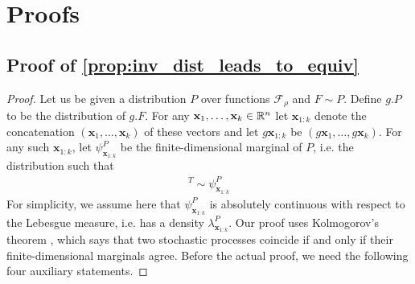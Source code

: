 \section{Proofs} \subsection{Proof of \cref{prop:inv_dist_leads_to_equiv} } \label{proof:invprior} \begin{proof} Let us be given a distribution $P$ over functions $\mathcal{F}_\rho$ and $F\sim P$.
	Define $g.P$ to be the distribution of $g.F$.
	For any $\mathbf{x}_1,\dots,\mathbf{x}_k\in\mathbb{R}^n$ let $\mathbf{x}_{1:k}$ denote the concatenation $(\mathbf{x}_1,\dots,\mathbf{x}_k)$ of these vectors and let $g\mathbf{x}_{1:k}$ be $(g\mathbf{x}_1,\dots,g\mathbf{x}_k)$.
	For any such $\mathbf{x}_{1:k}$, let $\psi_{\mathbf{x}_{1:k}}^P$ be the finite-dimensional marginal of $P$, i.e. the distribution such that \begin{align*} [F(\mathbf{x}_1),\dots,F(\mathbf{x}_k)]^T\sim \psi_{\mathbf{x}_{1:k}}^P \end{align*} For simplicity, we assume here that $\psi_{\mathbf{x}_{1:k}}^{P}$ is absolutely continuous with respect to the Lebesgue measure, i.e. has a density $\lambda_{\mathbf{x}_{1:k}}^P$.
	Our proof uses Kolmogorov's theorem \parencite{KolmogorowReference}, which says that two stochastic processes coincide if and only if their finite-dimensional marginals agree.
	Before the actual proof, we need the following four auxiliary statements.


\end{proof}
